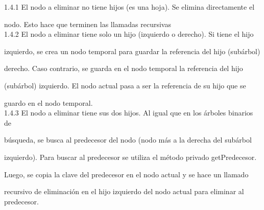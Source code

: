 \documentclass{article}
\begin{document}
\begin{itemize}
\begin{enumerate}
\hspace{1cm} 1.4.1 El nodo a eliminar no tiene hijos (es una hoja). Se elimina directamente el

\hspace{1.8cm} nodo. Esto hace que terminen las llamadas recursivas\\

\hspace{1cm}1.4.2 El nodo a eliminar tiene solo un hijo (izquierdo o derecho). Si tiene el hijo 

\hspace{1.8cm}izquierdo, se crea un nodo temporal para guardar la referencia del hijo (subárbol) 

\hspace{1.8cm}derecho. Caso contrario, se guarda en el nodo temporal la referencia del hijo

\hspace{1.8cm}(subárbol) izquierdo. El nodo actual pasa a ser la referencia de su hijo que se 

\hspace{1.8cm}guardo en el nodo temporal.\\

\hspace{1cm} 1.4.3 El nodo a eliminar tiene sus dos hijos. Al igual que en los árboles binarios de 

\hspace{1.8cm}búsqueda, se busca al predecesor del nodo (nodo más a la derecha del subárbol 

\hspace{1.8cm}izquierdo). Para buscar al predecesor se utiliza el método privado getPredecesor. 

\hspace{1.8cm}Luego, se copia la clave del predecesor en el nodo actual y se hace un llamado

\hspace{1.8cm}recursivo de eliminación en el hijo izquierdo del nodo actual para eliminar al predecesor.\\


\end{enumerate}
\end{itemize}
\end{document}
